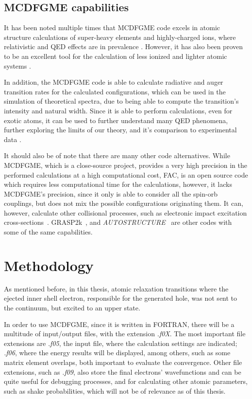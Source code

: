 \subsection{MCDFGME capabilities}

It has been noted multiple times that \gls{MCDFGME} code excels in atomic structure calculations of super-heavy elements and highly-charged ions, where relativistic and QED effects are in prevalence \cite{Indelicato2011,Indelicato1987,Gorceix1987}. However, it has also been proven to be an excellent tool for the calculation of less ionized and lighter atomic systems \cite{Guerra2021}.

In addition, the \gls{MCDFGME} code is able to calculate radiative and auger transition rates for the calculated configurations, which can be used in the simulation of theoretical spectra, due to being able to compute the transition's intensity and natural width.
Since it is able to perform calculations, even for exotic atoms, it can be used to further understand many QED phenomena, further exploring the limits of our theory, and it's comparison to experimental data \cite{Paul2021}.

It should also be of note that there are many other code alternatives. While \gls{MCDFGME}, which is a close-source project, provides a very high precision in the performed calculations at a high computational cost, \gls{FAC}, is an open source code which requires less computational time for the calculations, however, it lacks \gls{MCDFGME}'s precision, since it only is able to consider all the spin-orb couplings, but does not mix the possible configurations originating them. 
It can, however, calculate other collisional processes, such as electronic impact excitation cross-sections~\cite{FAC}. \gls{GRASP2k}~\cite{GRASP2K}, and \textit{AUTOSTRUCTURE}~\cite{AUTOSTRUCTURE} are other codes with some of the same capabilities.


\section{Methodology}

As mentioned before, in this thesis, atomic relaxation transitions where the ejected inner shell electron, responsible for the generated hole, was not sent to the continuum, but excited to an upper state.

In order to use \gls{MCDFGME}, since it is written in FORTRAN, there will be a multitude of input/output files, with the extension \textit{.f0X}. The most important file extensions are \textit{.f05}, the input file, where the calculation settings are indicated; \textit{.f06}, where the energy results will be displayed, among others, such as some matrix element overlaps, both important to evaluate the convergence.
 Other file extensions, such as \textit{.f09}, also store the final electrons' wavefunctions and can be quite useful for debugging processes, and for calculating other atomic parameters, such as shake probabilities, which will not be of relevance as of this thesis.

